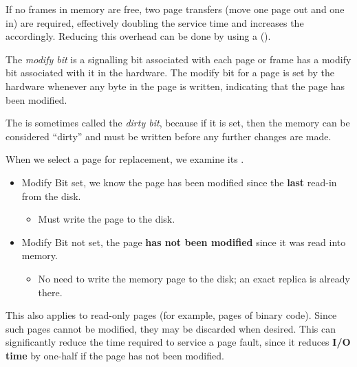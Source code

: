 If no frames in memory are free, two page transfers (move one page out and one in) are required, effectively doubling the  service time and increases the  accordingly.
Reducing this overhead can be done by using a  ().

\begin{definition}\label{def:Modify_Bit}
  The \emph{modify bit} is a signalling bit associated with each page or frame has a modify bit associated with it in the hardware.
  The modify bit for a page is set by the hardware whenever any byte in the page is written, indicating that the page has been modified.

  \begin{remark}\label{rmk:Dirty_Bit}
    The  is sometimes called the \emph{dirty bit}, because if it is set, then the memory can be considered ``dirty'' and must be written before any further changes are made.
  \end{remark}
\end{definition}

When we select a page for replacement, we examine its .
\begin{itemize}[noitemsep]
\item Modify Bit set, we know the page has been modified since the \textbf{last} read-in from the disk.
  \begin{itemize}[noitemsep]
  \item Must write the page to the disk.
  \end{itemize}
\item Modify Bit not set, the page \textbf{has not been modified} since it was read into memory.
  \begin{itemize}[noitemsep]
  \item No need to write the memory page to the disk; an exact replica is already there.
  \end{itemize}
\end{itemize}

\begin{remark*}
  This also applies to read-only pages (for example, pages of binary code).
  Since such pages cannot be modified, they may be discarded when desired.
  This can significantly reduce the time required to service a page fault, since it reduces \textbf{I/O time} by one-half if the page has not been modified.
\end{remark*}

